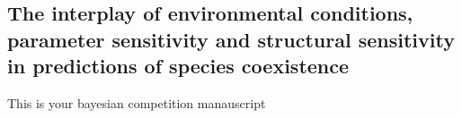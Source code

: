 \begin{refsection}
\chapter{The interplay of environmental conditions, parameter sensitivity and structural sensitivity in predictions of species coexistence} %
\label{Bayesian_competition}

This is your bayesian competition manauscript

\end{refsection}
